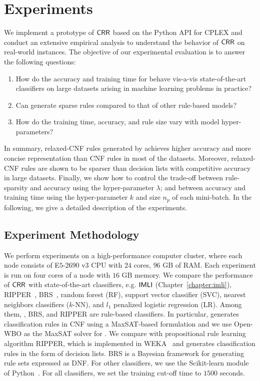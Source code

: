 \section{Experiments}\label{interpretability_crr_sec:experiment}
We implement a prototype  of  $ \mathsf{CRR} $ based on the  Python API for CPLEX  and conduct an extensive  empirical analysis to understand the behavior of $\mathsf{CRR}$ on real-world instances. The objective of our experimental evaluation is to answer the following questions:


\begin{enumerate}
	\item How do the accuracy and training time for  {\crr}  behave vis-a-vis state-of-the-art classifiers on large datasets arising in machine learning problems in practice?
	\item Can {\crr} generate sparse rules compared to that of  other rule-based models? 
	\item How do the training time, accuracy, and rule size vary with model hyper-parameters?
\end{enumerate}


In summary, relaxed-CNF rules generated by {\crr} achieves higher accuracy and more concise representation than CNF rules in most of the datasets. Moreover, relaxed-CNF rules are shown to be sparser than decision lists with competitive accuracy in large datasets.  Finally, we show how to control the trade-off between rule-sparsity and accuracy using the hyper-parameter $ \lambda $; and between accuracy and training time using the hyper-parameter $ k $ and size $ n_p $ of each mini-batch. In the following, we give a detailed description of the experiments. 



\subsection{Experiment Methodology}
We perform experiments on a high-performance computer cluster, where each node consists of E$ 5$-$2690\text{ v}3 $ CPU with $ 24 $ cores, $ 96 $ GB of RAM. Each experiment is run on four cores of a node with $ 16 $ GB memory.   We compare the performance of  $ \mathsf{CRR} $   with  state-of-the-art classifiers, e.g. $ \mathsf{IMLI}  $ (Chapter~\ref{chapter:imli}), RIPPER~\cite{cohen1995fast}, BRS~\cite{wang2017bayesian},  random forest (RF), support vector classifier (SVC), nearest neighbors classifiers ($ k $-NN), and $ l_1 $ penalized logistic regression (LR). Among them, {\IMLI}, BRS, and RIPPER are rule-based classifiers. In particular,
{\IMLI} generates classification rules in CNF using a MaxSAT-based formulation and we use Open-WBO \cite{martins2014open} as the MaxSAT solver for {\IMLI}. We compare with propositional rule learning algorithm RIPPER, which is implemented in WEKA~\cite{HFHPRW2009} and generates classification rules in the form of decision lists. BRS is a Bayesian framework for generating rule sets expressed as DNF. For  other classifiers, we use the Scikit-learn module of Python~\cite{scikit-learn}. For all  classifiers, we set the training cut-off time to $ 1500 $  {seconds}. 

